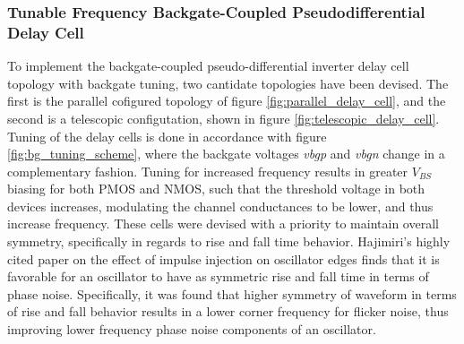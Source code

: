 
			\FloatBarrier\subsubsection{Tunable Frequency Backgate-Coupled Pseudodifferential Delay Cell}
			To implement the backgate-coupled pseudo-differential inverter delay cell topology with backgate tuning, two cantidate topologies have been devised. The first is the parallel cofigured topology of figure \ref{fig:parallel_delay_cell}, and the second is a telescopic configutation, shown in figure \ref{fig:telescopic_delay_cell}. Tuning of the delay cells is done in accordance with figure \ref{fig:bg_tuning_scheme}, where the backgate voltages \textit{vbgp} and \textit{vbgn} change in a complementary fashion. Tuning for increased frequency results in greater $V_{BS}$ biasing for both PMOS and NMOS, such that the threshold voltage in both devices increases, modulating the channel conductances to be lower, and thus increase frequency. These cells were devised with a priority to maintain overall symmetry, specifically in regards to rise and fall time behavior. Hajimiri's highly cited paper \cite{Hajimiri1998} on the effect of impulse injection on oscillator edges finds that it is favorable for an oscillator to have as symmetric rise and fall time in terms of phase noise. Specifically, it was found that higher symmetry of waveform in terms of rise and fall behavior results in a lower corner frequency for flicker noise, thus improving lower frequency phase noise components of an oscillator. 

